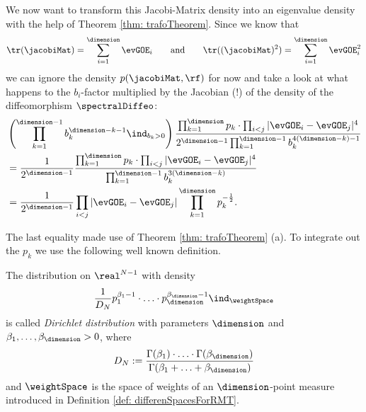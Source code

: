 We now want to transform this Jacobi-Matrix density into an eigenvalue density with the help of Theorem \ref{thm: trafoTheorem}. Since we know that
$$ \tr(\jacobiMat) = \sum_{i=1}^\dimension \evGOE_i \qquad \text{and} \qquad \tr((\jacobiMat)^2) = \sum_{i=1}^\dimension \evGOE_i^2 $$
we can ignore the density $p(\jacobiMat,\rf)$ for now and take a look at what happens to the $b_i$-factor multiplied by the Jacobian (!) of the density of the diffeomorphism $\spectralDiffeo$:
\begin{align*}
    & \left(\prod_{k=1}^{\dimension-1} b_k^{\dimension-k-1} \ind_{b_k>0} \right)
    \frac{\prod_{k=1}^\dimension p_k \cdot \prod_{i<j} |\evGOE_i - \evGOE_j|^4}{2^{\dimension-1} \prod_{k=1}^{\dimension-1} b_k^{4(\dimension - k)-1}} \\
    & = \frac{1}{2^{\dimension-1}}  \frac{\prod_{k=1}^\dimension p_k \cdot \prod_{i<j} |\evGOE_i - \evGOE_j|^4}{\prod_{k=1}^{\dimension-1} b_k^{3(\dimension - k)}} \\
    & = \frac{1}{2^{\dimension-1}} \prod_{i<j} |\evGOE_i - \evGOE_j| \prod_{k=1}^\dimension p_k^{-\frac{1}{2}}.
\end{align*}

The last equality made use of Theorem \ref{thm: trafoTheorem} (a). To integrate out the $p_k$ we use the following well known definition.

\begin{definition}
    The distribution on $\real^{N-1}$ with density
    \begin{align*}
        \frac{1}{D_N} p_1^{\beta_1 - 1} \cdot \ldots \cdot p_\dimension^{\beta_\dimension-1} \ind_{\weightSpace}
    \end{align*}
    is called \textit{Dirichlet distribution} with parameters $\dimension$ and $\beta_1,\ldots,\beta_\dimension > 0$, where
    \begin{align*}
        D_N := \frac{\Gamma(\beta_1)\cdot \ldots \cdot \Gamma(\beta_{\dimension})}{\Gamma(\beta_1+\ldots+\beta_\dimension)}
    \end{align*}
    and $\weightSpace$ is the space of weights of an $\dimension$-point measure introduced in Definition \ref{def: differenSpacesForRMT}.
\end{definition}

